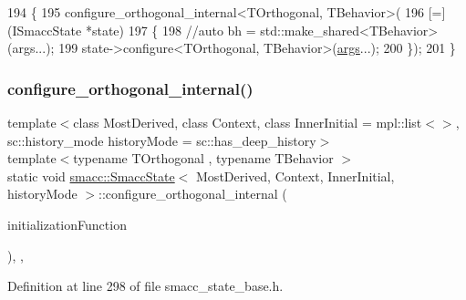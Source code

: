 \begin{DoxyCode}
194     \{
195     configure\_orthogonal\_internal<TOrthogonal, TBehavior>(
196       [=](ISmaccState *state) 
197       \{
198         \textcolor{comment}{//auto bh = std::make\_shared<TBehavior>(args...);}
199         state->configure<TOrthogonal, TBehavior>(\hyperlink{namespacegenerate__debs_a75f9143e38df82d83b2e8a6f99cae02c}{args}...);
200       \});
201     \}
\end{DoxyCode}
\mbox{\label{classsmacc_1_1SmaccState_a1656e6a5fd9ec036267a740a00260bf3}} 
\subsubsection{\texorpdfstring{configure\+\_\+orthogonal\+\_\+internal()}{configure\_orthogonal\_internal()}}
{\footnotesize\ttfamily template$<$class Most\+Derived, class Context, class Inner\+Initial = mpl\+::list$<$$>$, sc\+::history\+\_\+mode history\+Mode = sc\+::has\+\_\+deep\+\_\+history$>$ \\
template$<$typename T\+Orthogonal , typename T\+Behavior $>$ \\
static void \hyperlink{classsmacc_1_1SmaccState}{smacc\+::\+Smacc\+State}$<$ Most\+Derived, Context, Inner\+Initial, history\+Mode $>$\+::configure\+\_\+orthogonal\+\_\+internal (\begin{DoxyParamCaption}\item[{std\+::function$<$ void(\hyperlink{classsmacc_1_1ISmaccState}{I\+Smacc\+State}$<$ Most\+Derived, Context, Inner\+Initial, history\+Mode $>$ $\ast$state)$>$}]{initialization\+Function }\end{DoxyParamCaption})\hspace{0.3cm}{\ttfamily [inline]}, {\ttfamily [static]}, {\ttfamily [private]}}



Definition at line 298 of file smacc\+\_\+state\+\_\+base.\+h.


